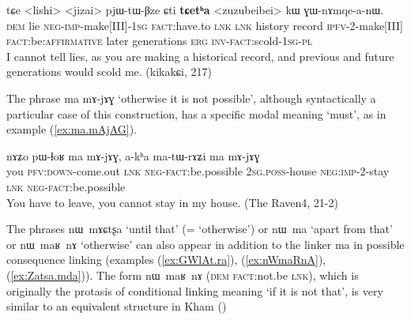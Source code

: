 \documentclass[oldfontcommands,oneside,a4paper,11pt]{article}
\newcommand{\ipa}[1]{{\phon \mbox{#1}}} %
\newcommand{\refb}[1]{(\ref{#1})}
\begin{document}
\begin{exe}
\ex \label{ex:matABzea}
\gll 
[\ipa{nɯ}    	\ipa{kʰramba}    	\ipa{ma-tɤ-βze-a}    	\ipa{ra}]    	\ipa{\textbf{ma}}    	\ipa{tɕe}    	<lishi>    	<jizai>    	\ipa{pjɯ-tɯ-βze}    	\ipa{ɕti}    	    	\ipa{\textbf{tɕetʰa}}    		     <zuzubeibei>    	\ipa{kɯ}    	\ipa{ɣɯ-nɤmqe-a-nɯ.}    \\
\textsc{dem}  lie \textsc{neg-imp}-make[III]-\textsc{1sg} \textsc{fact}:have.to \textsc{lnk} \textsc{lnk}   history record \textsc{ipfv}-2-make[III] \textsc{fact}:be:\textsc{affirmative} later generations \textsc{erg}  \textsc{inv-fact}:scold-\textsc{1sg-pl} \\
\glt I cannot tell lies, as   you are making a historical record, and previous and future generations would scold me.  (kikakɕi, 217)
 \end{exe}

The phrase \ipa{ma}  	\ipa{mɤ-jɤɣ} `otherwise it is not possible', although syntactically a particular case of this construction, has a specific modal meaning `must', as in example \refb{ex:ma.mAjAG}.


\begin{exe}
\ex \label{ex:ma.mAjAG}
\gll 
\ipa{nɤʑo}  	\ipa{pɯ-ɬoʁ}  	\ipa{ma}  	\ipa{mɤ-jɤɣ,}  	\ipa{a-kʰa}  	\ipa{ma-tɯ-rɤʑi}  	\ipa{ma}  	\ipa{mɤ-jɤɣ}  \\
you \textsc{pfv:down}-come.out \textsc{lnk} \textsc{neg-fact}:be.possible \textsc{2sg.poss}-house \textsc{neg:imp}-2-stay \textsc{lnk} \textsc{neg-fact}:be.possible \\
\glt You have to leave, you cannot stay in my house. (The Raven4, 21-2)
 \end{exe}


The phrases \ipa{nɯ mɤɕtʂa} `until that' (= `otherwise') or \ipa{nɯ ma} `apart from that' or \ipa{nɯ maʁ nɤ} `otherwise' can also appear in addition to the linker \ipa{ma} in possible consequence linking (examples \refb{ex:GWlAt.ra}, \refb{ex:nWmaRnA}, \refb{ex:Zatsa.mda}). The form \ipa{nɯ maʁ nɤ} (\textsc{dem} \textsc{fact}:not.be \textsc{lnk}), which is originally the protasis of conditional linking meaning `if it is not that', is very similar to an equivalent structure in Kham (\citealt[112]{watters09kham})
 
\end{document}
